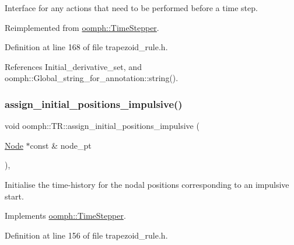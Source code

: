 Interface for any actions that need to be performed before a time step. 

Reimplemented from \hyperlink{classoomph_1_1TimeStepper_a36cbcee0c1127085ba3aa2331bfc0f74}{oomph\+::\+Time\+Stepper}.



Definition at line 168 of file trapezoid\+\_\+rule.\+h.



References Initial\+\_\+derivative\+\_\+set, and oomph\+::\+Global\+\_\+string\+\_\+for\+\_\+annotation\+::string().

\mbox{\label{classoomph_1_1TR_a46878c5cd5b9d20afb2f5d9ab7a7df26}} 
\subsubsection{\texorpdfstring{assign\+\_\+initial\+\_\+positions\+\_\+impulsive()}{assign\_initial\_positions\_impulsive()}}
{\footnotesize\ttfamily void oomph\+::\+T\+R\+::assign\+\_\+initial\+\_\+positions\+\_\+impulsive (\begin{DoxyParamCaption}\item[{\hyperlink{classoomph_1_1Node}{Node} $\ast$const \&}]{node\+\_\+pt }\end{DoxyParamCaption})\hspace{0.3cm}{\ttfamily [inline]}, {\ttfamily [virtual]}}



Initialise the time-\/history for the nodal positions corresponding to an impulsive start. 



Implements \hyperlink{classoomph_1_1TimeStepper_ab66972f0eaf3ba34645793e23e46afd5}{oomph\+::\+Time\+Stepper}.



Definition at line 156 of file trapezoid\+\_\+rule.\+h.

\mbox{\label{classoomph_1_1TR_aa73845654866b5cf65ee801f67baa6b3}} 
